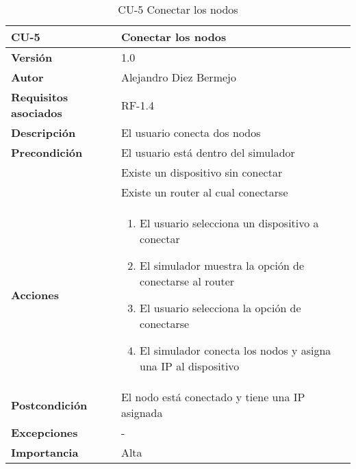 \begin{table}[p]
	\centering
	\begin{tabularx}{\linewidth}{ p{} p{} }
		\toprule
		\textbf{CU-5}    & \textbf{Conectar los nodos}\\
		\toprule
		\textbf{Versión}              & 1.0    \\
		\textbf{Autor}                & Alejandro Diez Bermejo \\
		\textbf{Requisitos asociados} & RF-1.4 \\
		\textbf{Descripción}          & El usuario conecta dos nodos \\
		\textbf{Precondición}         & El usuario está dentro del simulador \\
                                      & Existe un dispositivo sin conectar \\
                                      & Existe un router al cual conectarse \\
		\textbf{Acciones}             &
		\begin{enumerate}
			\def\labelenumi{\arabic{enumi}.}
			\tightlist
			\item El usuario selecciona un dispositivo a conectar
            \item El simulador muestra la opción de conectarse al router
            \item El usuario selecciona la opción de conectarse
            \item El simulador conecta los nodos y asigna una IP al dispositivo
		\end{enumerate}\\
		\textbf{Postcondición}        & El nodo está conectado y tiene una IP asignada \\
		\textbf{Excepciones}          & - \\
		\textbf{Importancia}          & Alta \\
		\bottomrule
	\end{tabularx}
	\caption{CU-5 Conectar los nodos}
\end{table}

